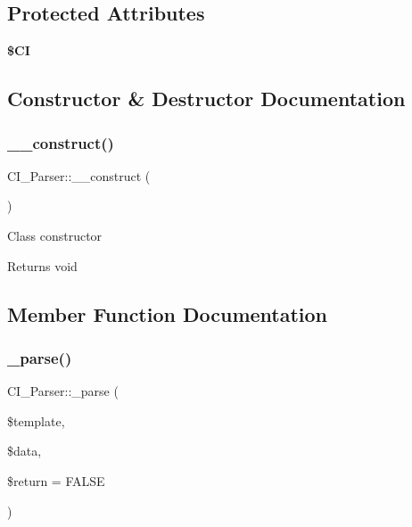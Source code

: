 \subsection*{Protected Attributes}
\begin{DoxyCompactItemize}
\item 
\mbox{\label{class_c_i___parser_a04a2f8e0e1fe18874cf5b25f0e9f2cde}} 
{\bfseries \$\+CI}
\end{DoxyCompactItemize}


\subsection{Constructor \& Destructor Documentation}
\mbox{\label{class_c_i___parser_ab10eaec56333ec25c4af1a718b95e7a5}} 
\subsubsection{\texorpdfstring{\+\_\+\+\_\+construct()}{\_\_construct()}}
{\footnotesize\ttfamily C\+I\+\_\+\+Parser\+::\+\_\+\+\_\+construct (\begin{DoxyParamCaption}{ }\end{DoxyParamCaption})}

Class constructor

\begin{DoxyReturn}{Returns}
void 
\end{DoxyReturn}


\subsection{Member Function Documentation}
\mbox{\label{class_c_i___parser_a55e181f6bcc8e94d023b0ec3f72adf32}} 
\subsubsection{\texorpdfstring{\+\_\+parse()}{\_parse()}}
{\footnotesize\ttfamily C\+I\+\_\+\+Parser\+::\+\_\+parse (\begin{DoxyParamCaption}\item[{}]{\$template,  }\item[{}]{\$data,  }\item[{}]{\$return = {\ttfamily FALSE} }\end{DoxyParamCaption})\hspace{0.3cm}{\ttfamily [protected]}}

